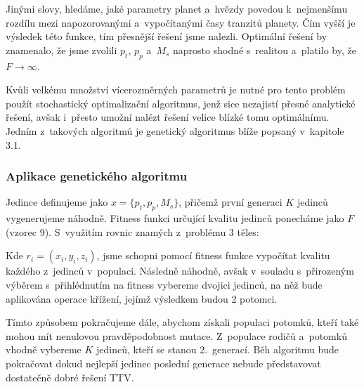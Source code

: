 \documentclass[a4paper,12pt]{article}
\begin{document}
{{{

Jinými slovy, hledáme, jaké parametry planet a~hvězdy povedou k~nejmenšímu rozdílu mezi napozorovanými a~vypočítanými časy tranzitů planety. Čím vyšší je výsledek této funkce, tím přesnější řešení jsme nalezli. Optimální řešení by znamenalo, že jsme zvolili $p_t$, $p_p$ a~$M_s$ naprosto shodné s~realitou a~platilo by, že $F\to\infty$.

Kvůli velkému množství vícerozměrných parametrů je nutné pro tento problém použít stochastický optimalizační algoritmus, jenž sice nezajistí přesné analytické řešení, avšak i~přesto umožní nalézt řešení velice blízké tomu optimálnímu. Jedním z~takových algoritmů je genetický algoritmus blíže popsaný v~kapitole 3.1.~\cite{ttv}

\subsubsection{Aplikace genetického algoritmu}

Jedince definujeme jako $x = \{p_t, p_p, M_s\}$, přičemž první generaci $K$ jedinců vygenerujeme náhodně. Fitness funkci určující kvalitu jedinců ponecháme jako $F$ (vzorec 9). S~využitím rovnic znamých z~problému 3 těles:


Kde $r_i = (x_i, y_i, z_i)$, jsme schopni pomocí fitness funkce vypočítat kvalitu každého z~jedinců v~populaci. Následně náhodně, avšak v~souladu s~přirozeným výběrem s~přihlédnutím na fitness vybereme dvojici jedinců, na něž bude aplikována operace křížení, jejímž výsledkem budou 2 potomci.~\cite{ttv}

Tímto způsobem pokračujeme dále, abychom získali populaci potomků, kteří také mohou mít nenulovou pravděpodobnost mutace. Z~populace rodičů a~potomků vhodně vybereme $K$ jedinců, kteří se stanou 2.~generací. Běh algoritmu bude pokračovat dokud nejlepší jedinec poslední generace nebude představovat dostatečně dobré řešení TTV.

}}}
\end{document}
